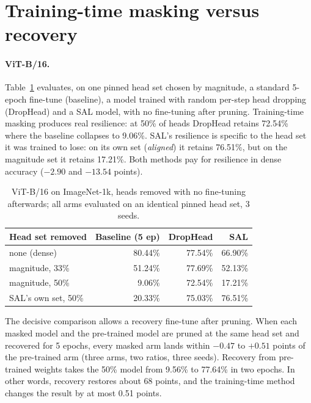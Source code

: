 \documentclass[11pt,a4paper]{article}
\begin{document}
\section{Training-time masking versus recovery}
\label{sec:masking}

\paragraph{ViT-B/16.} Table~\ref{tab:masking} evaluates, on one pinned head set chosen by magnitude, a standard 5-epoch fine-tune (baseline), a model trained with random per-step head dropping (DropHead) and a SAL model, with no fine-tuning after pruning. Training-time masking produces real resilience: at 50\% of heads DropHead retains 72.54\% where the baseline collapses to 9.06\%. SAL's resilience is specific to the head set it was trained to lose: on its own set (\emph{aligned}) it retains 76.51\%, but on the magnitude set it retains 17.21\%. Both methods pay for resilience in dense accuracy ($-2.90$ and $-13.54$ points).

\begin{table}[t]
\centering
\caption{ViT-B/16 on ImageNet-1k, heads removed with no fine-tuning afterwards; all arms evaluated on an identical pinned head set, 3 seeds.}
\label{tab:masking}
\begin{tabular}{lrrr}
\toprule
Head set removed & Baseline (5 ep) & DropHead & SAL \\
\midrule
none (dense) & 80.44\% & 77.54\% & 66.90\% \\
magnitude, 33\% & 51.24\% & 77.69\% & 52.13\% \\
magnitude, 50\% & 9.06\% & 72.54\% & 17.21\% \\
SAL's own set, 50\% & 20.33\% & 75.03\% & 76.51\% \\
\bottomrule
\end{tabular}
\end{table}

The decisive comparison allows a recovery fine-tune after pruning. When each masked model and the pre-trained model are pruned at the same head set and recovered for 5 epochs, every masked arm lands within $-0.47$ to $+0.51$ points of the pre-trained arm (three arms, two ratios, three seeds). Recovery from pre-trained weights takes the 50\% model from 9.56\% to 77.64\% in two epochs. In other words, recovery restores about 68 points, and the training-time method changes the result by at most 0.51 points.
\end{document}
